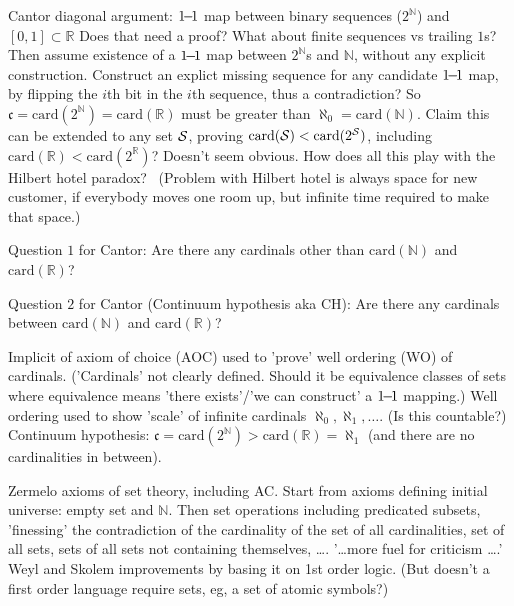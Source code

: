 Cantor diagonal argument:
\hfill\break
$1{\!}{-}{\!}1$ map between binary sequences ($2^{\mathbb{N}}$)
and $[0,1]\subset\mathbb{R}$
Does that need a proof?
What about finite sequences vs trailing $1$s? 
\hfill\break
Then assume existence of a $1{\!}{-}{\!}1$  
map between $2^{\mathbb{N}}$s 
and $\mathbb{N}$,
without any explicit construction.
Construct an explict missing sequence 
for any candidate $1{\!}{-}{\!}1$ map,
by flipping the $i$th bit in the $i$th sequence,
thus a contradiction?
So $\mathfrak{c} = \mathrm{card}(2^{\mathbb{N}}) 
= \mathrm{card}(\mathbb{R})$ must be greater than 
$\aleph_0 = \mathrm{card}(\mathbb{N})$. 
\hfill\break
Claim this can be extended to any set $\mathcal{S}$,
proving 
$\mathrm{card}(\mathcal{S}) < \mathrm{card}(2^{\mathcal{S}})$,
including 
$\mathrm{card}(\mathbb{R}) < \mathrm{card}(2^{\mathbb{R}})$?
Doesn't seem obvious.
\hfill\break
How does all this play with 
the Hilbert hotel paradox?~\cite{wiki:Hilbert_hotel}
(Problem with Hilbert hotel is 
always space for new customer, if everybody moves one room up,
but infinite time required to make that space.)

Question $1$ for Cantor:
\hfill\break
Are there any cardinals other than 
$\mathrm{card}(\mathbb{N})$ and 
$\mathrm{card}(\mathbb{R})$?

Question $2$ for Cantor (Continuum hypothesis aka CH):
\hfill\break
Are there any cardinals between
$\mathrm{card}(\mathbb{N})$ and 
$\mathrm{card}(\mathbb{R})$?

Implicit of axiom of choice (AOC) used to 'prove' 
well ordering (WO) of cardinals.
('Cardinals' not clearly defined.
Should it be equivalence classes of sets where
equivalence means 'there exists'/'we can construct'
a $1{\!}{-}{\!}1$ mapping.)
\hfill\break
Well ordering used to show 'scale' of infinite cardinals
$\aleph_0, \aleph_1, \ldots$. (Is this countable?)
\hfill\break
Continuum hypothesis: 
$\mathfrak{c} = \mathrm{card}(2^{\mathbb{N}}) 
> \mathrm{card}(\mathbb{R}) = \aleph_1$
(and there are no cardinalities in between).

Zermelo axioms of set theory, including AC.
Start from axioms defining initial universe:
empty set and $\mathbb{N}$.
Then set operations including predicated subsets,
'finessing' the contradiction of the
cardinality of the set of all cardinalities,
set of all sets,
sets of all sets not containing themselves, 
\ldots.
\hfill\break
'\ldots more fuel for criticism \ldots.'
Weyl and Skolem improvements by basing it on 1st order logic.
(But doesn't a first order language require sets,
eg, a set of atomic symbols?)

